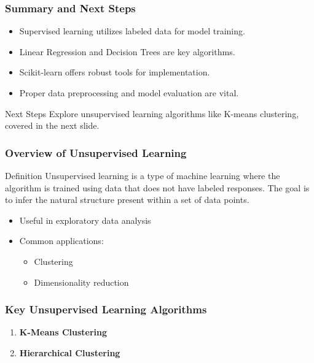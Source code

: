 \documentclass[aspectratio=169]{beamer}
\begin{document}
\begin{frame}[fragile]
    \frametitle{Summary and Next Steps}
    \begin{itemize}
        \item Supervised learning utilizes labeled data for model training.
        \item Linear Regression and Decision Trees are key algorithms.
        \item Scikit-learn offers robust tools for implementation.
        \item Proper data preprocessing and model evaluation are vital.
    \end{itemize}
    
    \begin{block}{Next Steps}
        Explore unsupervised learning algorithms like K-means clustering, covered in the next slide.
    \end{block}
\end{frame}

\begin{frame}
    \titlepage
\end{frame}

\begin{frame}
    \frametitle{Overview of Unsupervised Learning}
    \begin{block}{Definition}
        Unsupervised learning is a type of machine learning where the algorithm is trained using data that does not have labeled responses. The goal is to infer the natural structure present within a set of data points.
    \end{block}
    \begin{itemize}
        \item Useful in exploratory data analysis
        \item Common applications:
            \begin{itemize}
                \item Clustering
                \item Dimensionality reduction
            \end{itemize}
    \end{itemize}
\end{frame}

\begin{frame}
    \frametitle{Key Unsupervised Learning Algorithms}
    \begin{enumerate}
        \item \textbf{K-Means Clustering}
        \item \textbf{Hierarchical Clustering}
    \end{enumerate}
\end{frame}
\end{document}
